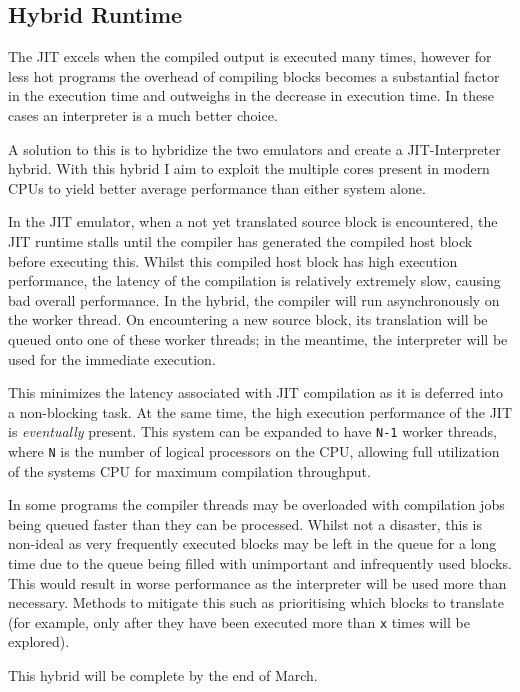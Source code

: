 \subsection{Hybrid Runtime}


The JIT excels when the compiled output is executed many times, however for less hot programs the overhead of compiling blocks becomes a substantial factor in the execution time and outweighs in the decrease in execution time. In these cases an interpreter is a much better choice.

A solution to this is to hybridize the two emulators and create a JIT-Interpreter hybrid. With this hybrid I aim to exploit the multiple cores present in modern CPUs to yield better average performance than either system alone.

In the JIT emulator, when a not yet translated source block is encountered, the JIT runtime stalls until the compiler has generated the compiled host block before executing this. Whilst this compiled host block has high execution performance, the latency of the compilation is relatively extremely slow, causing bad overall performance. In the hybrid, the compiler will run asynchronously on the worker thread. On encountering a new source block, its translation will be queued onto one of these worker threads; in the meantime, the interpreter will be used for the immediate execution.

This minimizes the latency associated with JIT compilation as it is deferred into a non-blocking task. At the same time, the high execution performance of the JIT is \emph{eventually} present. This system can be expanded to have \texttt{N-1} worker threads, where \texttt{N} is the number of logical processors on the CPU, allowing full utilization of the systems CPU for maximum compilation throughput.

In some programs the compiler threads may be overloaded with compilation jobs being queued faster than they can be processed. Whilst not a disaster, this is non-ideal as very frequently executed blocks may be left in the queue for a long time due to the queue being filled with unimportant and infrequently used blocks. This would result in worse performance as the interpreter will be used more than necessary. Methods to mitigate this such as prioritising which blocks to translate (for example, only after they have been executed more than \texttt{x} times will be explored).

This hybrid will be complete by the end of March.